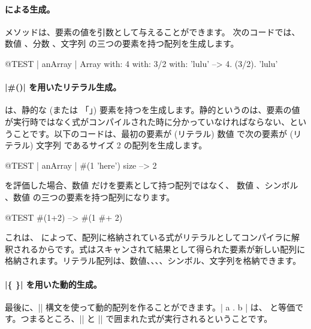 \documentclass[a4paper,10pt,twoside]{book}
\begin{document}
\paragraph{ による生成。}  メソッドは、要素の値を引数として与えることができます。
次のコードでは、数値 、分数 、文字列  の三つの要素を持つ配列を生成します。

\begin{code}{@TEST | anArray |}
Array with: 4 with: 3/2 with: 'lulu' -->  {4. (3/2). 'lulu'}
\end{code}

\paragraph{\ct|\#()| を用いたリテラル生成。}
\ct{#()} は、静的な (または 「」) 要素を持つを生成します。静的というのは、要素の値が実行時ではなく式がコンパイルされた時に分かっていなければならない、ということです。以下のコードは、最初の要素が (リテラル) 数値  で次の要素が (リテラル) 文字列  であるサイズ 2 の配列を生成します。


\begin{code}{@TEST | anArray |}
#(1 'here') size --> 2
\end{code}

 を評価した場合、数値  だけを要素として持つ配列ではなく、 \ie 数値 、シンボル \ct{#+}、数値  の三つの要素を持つ配列になります。

\begin{code}{@TEST}
#(1+2) -->  #(1 #+ 2)
\end{code}

\noindent
これは、\ct{#()} によって、配列に格納されている式がリテラルとしてコンパイラに解釈されるからです。式はスキャンされて結果として得られた要素が新しい配列に格納されます。リテラル配列は、数値、、、、シンボル、文字列を格納できます。

\paragraph{\ct|\{ \}| を用いた動的生成。}
最後に、\ct|{}| 構文を使って動的配列を作ることができます。\ct|{ a . b }| は、 と等価です。つまるところ、\ct|{| と \ct|}| で囲まれた式が実行されるということです。
\end{document}
